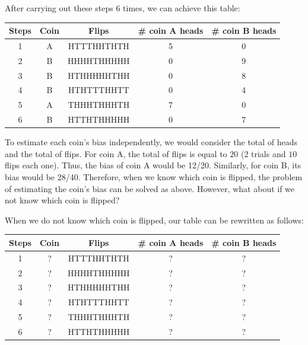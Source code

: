 After carrying out these steps $6$ times, we can achieve this table:

\begin{center}
\begin{tabular}{|c|c|c|c|c|} 
 \hline
 \textbf{Steps} &\textbf{Coin} & \textbf{Flips} & \textbf{\# coin A heads} & \textbf{\# coin B heads} \\ \hline 
1 & A & HTTTHHTHTH & 5 & 0\\ \hline 
2 & B & HHHHTHHHHH & 0 & 9\\ \hline
3 & B & HTHHHHHTHH	& 0 & 8\\ \hline 
4 & B & HTHTTTHHTT & 0 & 4\\ \hline
5 & A & THHHTHHHTH & 7 & 0\\ \hline 
6 & B & HTTHTHHHHH & 0 & 7\\ \hline
\end{tabular}
\end{center}

To estimate each coin's bias independently, we would consider the total of heads and the total of flips. For coin A, the total of flips is equal to $20$ ($2$ trials and $10$ flips each one). Thus, the bias of coin A would be 12/20. Similarly, for coin B, its bias would be 28/40. Therefore, when we know which coin is flipped, the problem of estimating the coin's bias can be solved as above. However, what about if we not know which coin is flipped?

When we do not know which coin is flipped, our table can be rewritten as follows:

\begin{center}
\begin{tabular}{|c|c|c|c|c|} 
 \hline
 \textbf{Steps} & \textbf{Coin} & \textbf{Flips} & \textbf{\# coin A heads} & \textbf{\# coin B heads} \\ \hline 
1 & ? & HTTTHHTHTH & ? & ?\\ \hline 
2 & ? & HHHHTHHHHH & ? & ?\\ \hline
3 & ? & HTHHHHHTHH	& ? & ?\\ \hline 
4 & ? & HTHTTTHHTT & ? & ?\\ \hline
5 & ? & THHHTHHHTH & ? & ?\\ \hline 
6 & ? & HTTHTHHHHH & ? & ?\\ \hline
\end{tabular}
\end{center}

